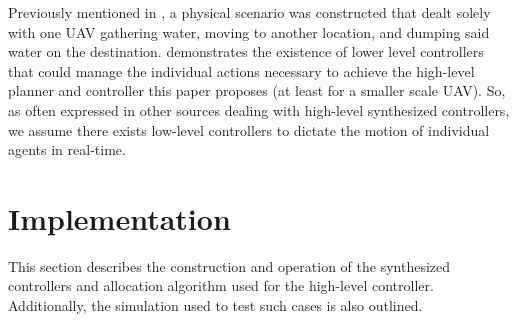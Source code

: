 \documentclass{ieeeaccess}
\newtheorem{rem}{Remark}
\begin{document}
Previously mentioned in \cite{c2}, a physical scenario was constructed that dealt solely with one UAV gathering water, moving to another location, and dumping said water on the destination. \cite{c2} demonstrates the existence of lower level controllers that could manage the individual actions necessary to achieve the high-level planner and controller this paper proposes (at least for a smaller scale UAV). So, as often expressed in other sources dealing with high-level synthesized controllers, we assume there exists low-level controllers to dictate the motion of individual agents in real-time.


\section{Implementation}

This section describes the construction and operation of the synthesized controllers and allocation algorithm used for the high-level controller. Additionally, the simulation used to test such cases is also outlined.

\end{document}
